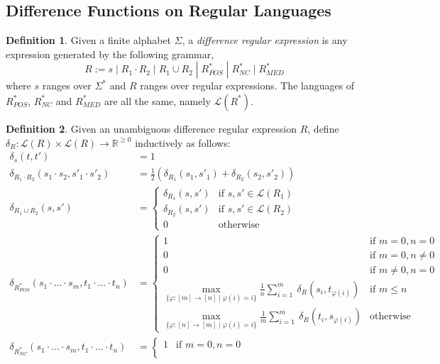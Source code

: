 \documentclass[acmsmall,review,anonymous]{acmart}\settopmatter{printfolios=true,printccs=false,printacmref=false}
\theoremstyle{definition}
\newtheorem{definition}{Definition}
\begin{document}
\subsection{Difference Functions on Regular Languages}
\begin{definition}
Given a finite alphabet $\Sigma$, a {\em difference regular expression} is any expression generated by the following grammar,
$$R := s \; | \; R_1 \cdot R_2 \; | \; R_1 \cup R_2 \; | \; R^*_{POS} \; | \; R^*_{NC} \; | \; R^*_{MED}$$
where $s$ ranges over $\Sigma^*$ and $R$ ranges over regular expressions. The languages of $R^*_{POS}$, $R^*_{NC}$ and $R^*_{MED}$ are all the same, namely $\mathcal{L}(R^*)$.
\end{definition}
\begin{definition}
Given an unambiguous difference regular expression $R$, define $\delta_R : \mathcal{L}(R) \times \mathcal{L}(R) \longrightarrow \mathbb{R}^{\geq 0}$ inductively as follows:
\begin{align*}
\delta_s(t, t') &= 1\\
\delta_{R_1 \cdot R_2}(s_1 \cdot s_2, s'_1 \cdot s'_2) &= \frac{1}{2}(\delta_{R_1}(s_1, s'_1) + \delta_{R_2}(s_2, s'_2))\\
\delta_{R_1 \cup R_2}(s, s') &= 
\begin{cases}
\delta_{R_1}(s, s') & \text{if }s, s' \in \mathcal{L}(R_1) \\
\delta_{R_2}(s, s') & \text{if }s, s' \in \mathcal{L}(R_2)\\
0 & \text{otherwise }
\end{cases}\\
\delta_{R^*_{POS}}(s_1 \cdot \ldots \cdot s_m, t_1 \cdot \ldots \cdot t_n) &= 
\begin{cases}
1 & \text{if } m = 0, n = 0\\ 
0 & \text{if } m = 0, n \neq 0\\
0 & \text{if } m \neq 0, n = 0\\\max\limits_{\{\varphi : [m] \longrightarrow [n] \; | \; \varphi(i) = i\}}\frac{1}{n}\sum\limits_{i=1}^{m}\ \delta_R(s_i, t_{\varphi(i)})& \text{if } m \leq n\\
\max\limits_{\{\varphi : [n] \longrightarrow [m] \; | \; \varphi(i) = i\}}\frac{1}{m}\sum\limits_{i=1}^{m}\ \delta_R(t_i, s_{\varphi(i)})& \text{otherwise}
\end{cases}\\
\delta_{R^*_{NC}}(s_1 \cdot \ldots \cdot s_m, t_1 \cdot \ldots \cdot t_n) &= 
\begin{cases}
1 & \text{if } m = 0, n = 0\\ 

\end{cases}
\end{align*}
\end{definition}
\end{document}
